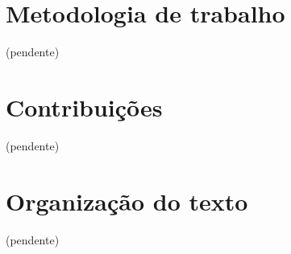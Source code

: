 \section{Metodologia de trabalho}

(pendente)

\section{Contribuições}

(pendente)

\section{Organização do texto}

(pendente)

